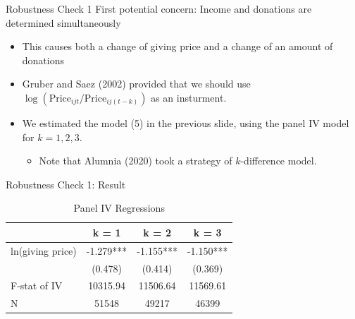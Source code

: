 \documentclass[
  ignorenonframetext,
]{beamer}
\providecommand{\tightlist}{%
  \setlength{\itemsep}{0pt}\setlength{\parskip}{0pt}}
\begin{document}
\begin{frame}{Robustness Check 1}
\protect\hypertarget{robustness-check-1}{}
First potential concern: Income and donations are determined
simultaneously

\begin{itemize}
\tightlist
\item
  This causes both a change of giving price and a change of an amount of
  donations
\item
  Gruber and Saez (2002) provided that we should use
  \(\log(\text{Price}_{ijt}/\text{Price}_{ij(t-k)})\) as an insturment.
\item
  We estimated the model (5) in the previous slide, using the panel IV
  model for \(k = 1, 2, 3\).

  \begin{itemize}
  \tightlist
  \item
    Note that Alumnia (2020) took a strategy of \(k\)-difference model.
  \end{itemize}
\end{itemize}
\end{frame}

\begin{frame}{Robustness Check 1: Result}
\protect\hypertarget{robustness-check-1-result}{}
\begin{table}

\caption{\label{tab:kablePanelIVEstimateElasticity}Panel IV Regressions}
\centering
\begin{tabular}[t]{lccc}
\toprule
 & k = 1 & k = 2 & k = 3\\
\midrule
ln(giving price) & -1.279*** & -1.155*** & -1.150***\\
 & (0.478) & (0.414) & (0.369)\\
F-stat of IV & 10315.94 & 11506.64 & 11569.61\\
N & 51548 & 49217 & 46399\\
\bottomrule
\end{tabular}
\end{table}
\end{frame}
\end{document}
